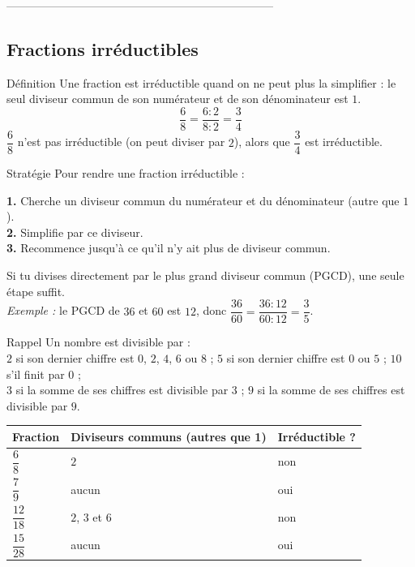 -----------------------------------------------------------------------
\subsection{Fractions irréductibles}
 
\begin{regle}{Définition}
Une fraction est \textcolor{themeColor}{irréductible} quand on ne peut plus la simplifier : le seul diviseur commun de son numérateur et de son dénominateur est $1$.
\[\dfrac{6}{8}=\dfrac{6 : 2}{8 : 2}=\dfrac{3}{4}\]
$\dfrac{6}{8}$ n'est pas irréductible (on peut diviser par $2$), alors que $\dfrac{3}{4}$ est irréductible.
\end{regle}
 
\vspace{15pt}
\begin{astuce}{Stratégie}
Pour rendre une fraction irréductible :
 
\vspace{5pt}
\textbf{1.} Cherche un diviseur commun du numérateur et du dénominateur (autre que $1$).\\
\textbf{2.} Simplifie par ce diviseur.\\
\textbf{3.} Recommence jusqu'à ce qu'il n'y ait plus de diviseur commun.
 
\vspace{5pt}
Si tu divises directement par le plus grand diviseur commun (\textcolor{themeColor}{PGCD}), une seule étape suffit.\\
\textit{Exemple :} le PGCD de $36$ et $60$ est $12$, donc $\dfrac{36}{60}=\dfrac{36 : 12}{60 : 12}=\dfrac{3}{5}$.
\end{astuce}
 
\vspace{15pt}
\begin{astuce}{Rappel}
Un nombre est divisible par :\\
$2$ si son dernier chiffre est $0$, $2$, $4$, $6$ ou $8$ ; \quad $5$ si son dernier chiffre est $0$ ou $5$ ; \quad $10$ s'il finit par $0$ ;\\
$3$ si la somme de ses chiffres est divisible par $3$ ; \quad $9$ si la somme de ses chiffres est divisible par $9$.
\end{astuce}
 
\vspace{15pt}
\def\arraystretch{3}
\begin{tabularx}{\linewidth}{|>{\centering\arraybackslash}X|>{\centering\arraybackslash}X|>{\centering\arraybackslash}X|}
\hline
\cellcolor{themeNO!30}\textbf{Fraction} & \cellcolor{themeNO!30}\textbf{Diviseurs communs (autres que 1)} & \cellcolor{themeNO!30}\textbf{Irréductible ?} \\\hline
$\dfrac{6}{8}$ & $2$ & non \\\hline
$\dfrac{7}{9}$ & aucun & oui \\\hline
$\dfrac{12}{18}$ & $2$, $3$ et $6$ & non \\\hline
$\dfrac{15}{28}$ & aucun & oui \\\hline
\end{tabularx}
\def\arraystretch{1}
 
